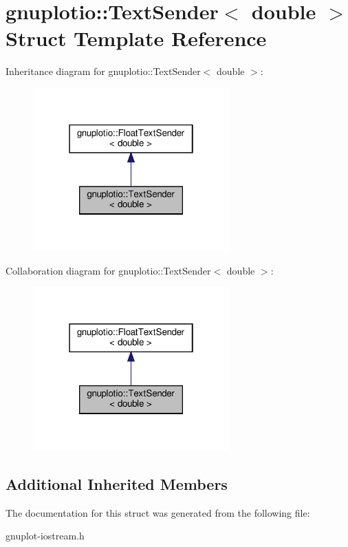 \hypertarget{structgnuplotio_1_1TextSender_3_01double_01_4}{}\section{gnuplotio\+:\+:Text\+Sender$<$ double $>$ Struct Template Reference}
\label{structgnuplotio_1_1TextSender_3_01double_01_4}


Inheritance diagram for gnuplotio\+:\+:Text\+Sender$<$ double $>$\+:
\nopagebreak
\begin{figure}[H]
\begin{center}
\leavevmode
\includegraphics[width=214pt]{structgnuplotio_1_1TextSender_3_01double_01_4__inherit__graph}
\end{center}
\end{figure}


Collaboration diagram for gnuplotio\+:\+:Text\+Sender$<$ double $>$\+:
\nopagebreak
\begin{figure}[H]
\begin{center}
\leavevmode
\includegraphics[width=214pt]{structgnuplotio_1_1TextSender_3_01double_01_4__coll__graph}
\end{center}
\end{figure}
\subsection*{Additional Inherited Members}


The documentation for this struct was generated from the following file\+:\begin{DoxyCompactItemize}
\item 
gnuplot-\/iostream.\+h\end{DoxyCompactItemize}
